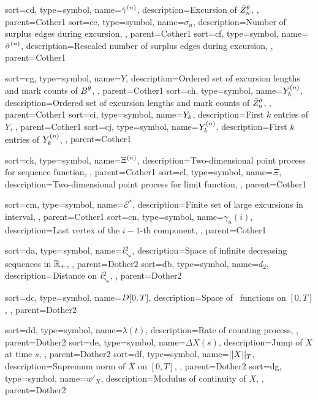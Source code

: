{
	sort={cd},
	type=symbol,
name={$\bar{\gamma}^{(n)}$},
description={Excursion of $\bar{Z}^{\theta}_n$, \pageref{L: sum rgamman}},
parent=Cother1
}
{
	sort={ce},
	type=symbol,
name={$\sigma_n$},
description={Number of surplus edges during excursion, \pageref{T: Main}},
parent=Cother1
}
{
	sort={cf},
	type=symbol,
name={$\bar{\sigma}^{(n)}$},
description={Rescaled number of surplus edges during excursion, \pageref{E: def Yn}},
parent=Cother1
}

{
	sort={cg},
	type=symbol,
name={$Y$},
description={Ordered set of excursion lengths and mark counts of $B^{\theta}$, \pageref{E: def Y}},
parent=Cother1
}
{
	sort={ch},
	type=symbol,
name={${Y}^{(n)}_k$},
description={Ordered set of excursion lengths and mark counts of $\bar{Z}^{\theta}_n$, \pageref{E: def Yn}},
parent=Cother1
}
{
	sort={ci},
	type=symbol,
name={${Y}_k$},
description={First $k$ entries of $Y$, \pageref{E: def Yk Ynk}},
parent=Cother1
}
{
	sort={cj},
	type=symbol,
name={${Y}^{(n)}_k$},
description={First $k$ entries of ${Y}^{(n)}_k$, \pageref{E: def Yk Ynk}},
parent=Cother1
}

{
	sort={ck},
	type=symbol,
	name={$\Xi^{(n)}$},
	description={Two-dimensional point process for sequence function, \pageref{L: Deterministic Lemma}},
	parent=Cother1
}
{
	sort={cl},
	type=symbol,
name={$\Xi$},
description={Two-dimensional point process for limit function, \pageref{L: Deterministic Lemma}},
parent=Cother1
}

{
	sort={cm},
	type=symbol,
	name={$\mathcal{E}^*$},
	description={Finite set of large excursions in interval, \pageref{L: Deterministic Lemma}},
	parent=Cother1
}
{
	sort={cn},
	type=symbol,
name={$\gamma_n(i)$},
description={Last vertex of the $i-1$-th component, \pageref{L: Lemma 8}},
parent=Cother1
}


{
	sort={da},
	type=symbol,
	name={$\mathit{l}^2_{\searrow}$},
	description={Space of infinite decreasing sequences in $\mathbb{R}_+$, \pageref{D: ld}},
	parent=Dother2
}
{
	sort={db},
	type=symbol,
	name={$d_2$},
	description={Distance on $\mathit{l}^2_{\searrow}$, \pageref{D: ld}},
	parent=Dother2
}

{
	sort={dc},
	type=symbol,
name={$D[0, T]$},
description={Space of \cadlag~functions on $[0,T]$, \pageref{D: DT}},
parent=Dother2
}

{
	sort={dd},
	type=symbol,
name={$\lambda(t)$},
description={Rate of counting process, \pageref{D: def gamma(A)}},
parent=Dother2
}
{
	sort={de},
	type=symbol,
name={$\Delta X(s)$},
description={Jump of $X$ at time $s$, \pageref{I: DeltaX}},
parent=Dother2
}
{
	sort={df},
	type=symbol,
name={$||X||_T$},
description={Supremum norm of $X$ on $[0,T]$, \pageref{I: supnorm}},
parent=Dother2
}
{
	sort={dg},
	type=symbol,
	name={$w'_X$},
	description={Modulus of continuity of $X$, \pageref{D: modulus of continuity}},
	parent=Dother2
}

